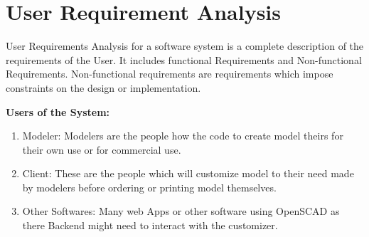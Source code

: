 \documentclass[12pt,includeheadfoot,a4paper]{report}
\begin{document}


\section{User Requirement Analysis}
User Requirements Analysis for a software system is a complete description of the requirements of the User. It includes functional Requirements
and Non-functional Requirements. Non-functional requirements are
requirements which impose constraints on the design or implementation.


{\bf Users of the System:}
\begin{enumerate}
	\item Modeler: Modelers are the people how the code to create model theirs for their own use or for commercial use.
	\item Client: These are the people which will customize model to their need made by modelers before ordering or printing model themselves.
	\item Other Softwares: Many web Apps or other software using OpenSCAD as there Backend might need to interact with the customizer.
	
\end{enumerate}
\end{document}

